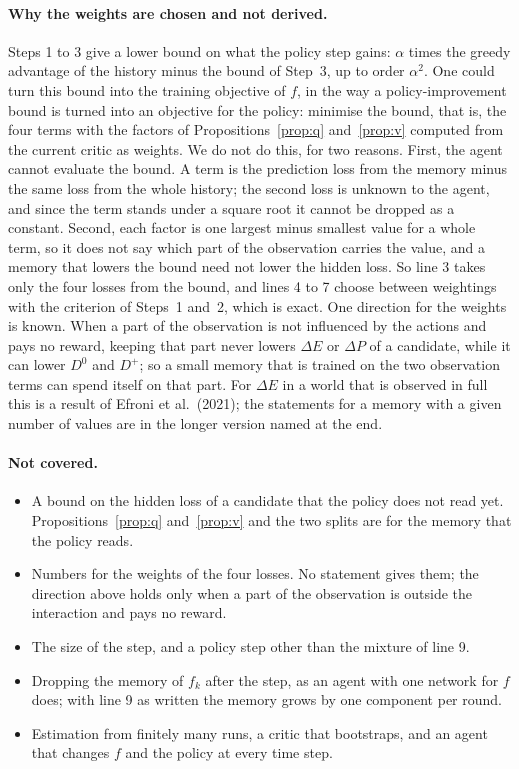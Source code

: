 \documentclass[11pt]{article}
\theoremstyle{definition}
\newcommand{\dE}{\Delta E}
\newcommand{\dP}{\Delta P}
\begin{document}
\paragraph{Why the weights are chosen and not derived.} Steps 1 to 3 give a lower bound on what the policy step gains: $\alpha$ times the greedy advantage of the history minus the bound of Step~3, up to order $\alpha^2$. One could turn this bound into the training objective of $f$, in the way a policy-improvement bound is turned into an objective for the policy: minimise the bound, that is, the four terms with the factors of Propositions~\ref{prop:q} and~\ref{prop:v} computed from the current critic as weights. We do not do this, for two reasons. First, the agent cannot evaluate the bound. A term is the prediction loss from the memory minus the same loss from the whole history; the second loss is unknown to the agent, and since the term stands under a square root it cannot be dropped as a constant. Second, each factor is one largest minus smallest value for a whole term, so it does not say which part of the observation carries the value, and a memory that lowers the bound need not lower the hidden loss. So line 3 takes only the four losses from the bound, and lines 4 to 7 choose between weightings with the criterion of Steps~1 and~2, which is exact. One direction for the weights is known. When a part of the observation is not influenced by the actions and pays no reward, keeping that part never lowers $\dE$ or $\dP$ of a candidate, while it can lower $D^0$ and $D^+$; so a small memory that is trained on the two observation terms can spend itself on that part. For $\dE$ in a world that is observed in full this is a result of Efroni et al.\ (2021); the statements for a memory with a given number of values are in the longer version named at the end.

\paragraph{Not covered.}
\begin{itemize}\setlength{\itemsep}{0pt}
\item A bound on the hidden loss of a candidate that the policy does not read yet. Propositions~\ref{prop:q} and~\ref{prop:v} and the two splits are for the memory that the policy reads.
\item Numbers for the weights of the four losses. No statement gives them; the direction above holds only when a part of the observation is outside the interaction and pays no reward.
\item The size of the step, and a policy step other than the mixture of line 9.
\item Dropping the memory of $f_k$ after the step, as an agent with one network for $f$ does; with line 9 as written the memory grows by one component per round.
\item Estimation from finitely many runs, a critic that bootstraps, and an agent that changes $f$ and the policy at every time step.
\end{itemize}
\end{document}
